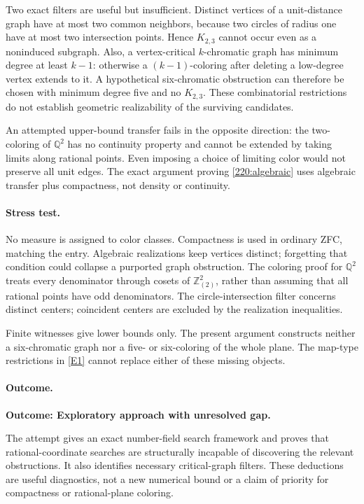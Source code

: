 \documentclass[11pt,a4paper]{article}
\newcommand{\Z}{\mathbb{Z}}
\newcommand{\Q}{\mathbb{Q}}
\newcommand{\eref}[2]{\hyperlink{extra:#1:#2}{[E#2]}}
\numberwithin{equation}{section}
\begin{document}
Two exact filters are useful but insufficient. Distinct vertices of a
unit-distance graph have at most two common neighbors, because two
circles of radius one have at most two intersection points. Hence $K_{2,3}$
cannot occur even as a noninduced subgraph. Also, a vertex-critical
$k$-chromatic graph has minimum degree at least $k-1$: otherwise a
$(k-1)$-coloring after deleting a low-degree vertex extends to it.
A hypothetical six-chromatic obstruction can therefore be chosen with
minimum degree five and no $K_{2,3}$. These combinatorial restrictions do
not establish geometric realizability of the surviving candidates.

An attempted upper-bound transfer fails in the opposite direction:
the two-coloring of $\Q^2$ has no continuity property and cannot be
extended by taking limits along rational points. Even imposing a
choice of limiting color would not preserve all unit edges. The exact
argument proving \eqref{220:algebraic} uses algebraic transfer plus
compactness, not density or continuity.

\paragraph{Stress test.}
No measure is assigned to color classes. Compactness is used in ordinary
ZFC, matching the entry. Algebraic realizations keep vertices distinct;
forgetting that condition could collapse a purported graph obstruction.
The coloring proof for $\Q^2$ treats every denominator through cosets of
$\Z_{(2)}^2$, rather than assuming that all rational points have odd
denominators. The circle-intersection filter concerns distinct centers;
coincident centers are excluded by the realization inequalities.

Finite witnesses give lower bounds only. The present argument constructs
neither a six-chromatic graph nor a five- or six-coloring of the whole
plane. The map-type restrictions in \eref{220}{1} cannot replace either
of these missing objects.

\paragraph{Outcome.}
\textbf{Outcome: Exploratory approach with unresolved gap.}

The attempt gives an exact number-field search framework and proves that
rational-coordinate searches are structurally incapable of discovering
the relevant obstructions. It also identifies necessary critical-graph
filters. These deductions are useful diagnostics, not a new numerical
bound or a claim of priority for compactness or rational-plane coloring.
\end{document}
